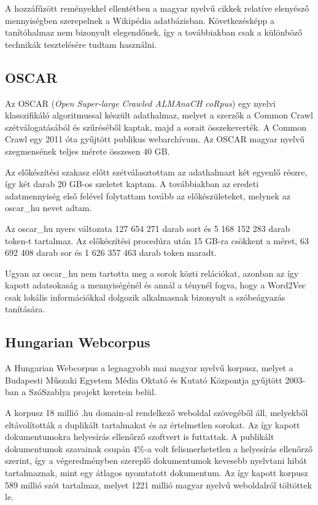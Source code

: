 A hozzáfűzött reményekkel ellentétben a magyar nyelvű cikkek relatíve elenyésző mennyiségben szerepelnek a Wikipédia adatbázisban. Következésképp a tanítóhalmaz nem bizonyult elegendőnek, így a továbbiakban csak a különböző technikák tesztelésére tudtam használni.


\subsection{OSCAR}

Az OSCAR (\textit{Open Super-large Crawled ALMAnaCH coRpus}) \cite{oscar} egy nyelvi klasszifikáló algoritmussal készült adathalmaz, melyet a szerzők a Common Crawl szétválogatásából és szűréséből kaptak, majd a sorait összekeverték. A Common Crawl egy 2011 óta gyűjtött publikus webarchívum. Az OSCAR magyar nyelvű szegmensének teljes mérete összesen 40 GB. 

Az előkészítési szakasz előtt szétválasztottam az adathalmazt két egyenlő részre, így két darab 20 GB-os szeletet kaptam. A továbbiakban az eredeti adatmennyiség első felével folytattam tovább az előkészületeket, melynek az oscar\_hu nevet adtam.

Az oscar\_hu nyers változata 127 654 271 darab sort és 5 168 152 283 darab token-t tartalmaz. Az előkészítési procedúra után 15 GB-ra csökkent a méret, 63 692 408 darab sor és 1 626 357 463 darab token maradt.

Ugyan az oscar\_hu nem tartotta meg a sorok közti relációkat, azonban az így kapott adatsokaság a mennyiségénél és annál a ténynél fogva, hogy a Word2Vec csak lokális információkkal dolgozik alkalmasnak bizonyult a szóbeágyazás tanítására.

\subsection{Hungarian Webcorpus}

A Hungarian Webcorpus \cite{hungarian_webcorpus} a legnagyobb mai magyar nyelvű korpusz, melyet a Budapesti Műszaki Egyetem Média Oktató és Kutató Központja gyűjtött 2003-ban a SzóSzablya projekt keretein belül.

A korpusz 18 millió .hu domain-al rendelkező weboldal szövegéből áll, melyekből eltávolították a duplikált tartalmakat és az értelmetlen sorokat. Az így kapott dokumentumokra helyesírás ellenőrző szoftvert is futtattak. A publikált dokumentumok szavainak csupán 4\%-a volt felismerhetetlen a helyesírás ellenőrző szerint, így a végeredményben szereplő dokumentumok kevesebb nyelvtani hibát tartalmaznak, mint egy átlagos nyomtatott dokumentum. Az így kapott korpusz 589 millió szót tartalmaz, melyet 1221 millió magyar nyelvű weboldalról töltöttek le.

